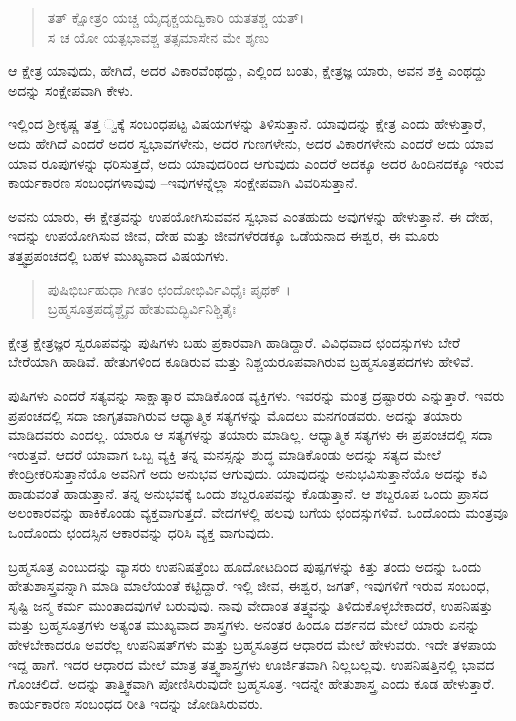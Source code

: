 \begin{verse}
ತತ್ ಕ್ಷೋತ್ರಂ ಯಚ್ಚ ಯೈದೃಕ್ಚಯದ್ವಿಕಾರಿ ಯತತಶ್ಚ ಯತ್​।\\ಸ ಚ ಯೋ ಯತ್ಪಭಾವಶ್ಚ ತತ್ಸಮಾಸೇನ ಮೇ ಶೃಣು 
\end{verse}

{\small ಆ ಕ್ಷೇತ್ರ ಯಾವುದು, ಹೇಗಿದೆ, ಅದರ ವಿಕಾರವೆಂಥದ್ದು, ಎಲ್ಲಿಂದ ಬಂತು, ಕ್ಷೇತ್ರಜ್ಞ ಯಾರು, ಅವನ ಶಕ್ತಿ ಎಂಥದ್ದು ಅದನ್ನು ಸಂಕ್ಷೇಪವಾಗಿ ಕೇಳು.}

ಇಲ್ಲಿಂದ ಶ್ರೀಕೃಷ್ಣ ತತ್ತ ್ವಕ್ಕೆ ಸಂಬಂಧಪಟ್ಟ ವಿಷಯಗಳನ್ನು ತಿಳಿಸುತ್ತಾನೆ. ಯಾವುದನ್ನು ಕ್ಷೇತ್ರ ಎಂದು ಹೇಳುತ್ತಾರೆ, ಅದು ಹೇಗಿದೆ ಎಂದರೆ ಅದರ ಸ್ವಭಾವಗಳೇನು, ಅದರ ಗುಣಗಳೇನು, ಅದರ ವಿಕಾರಗಳೇನು ಎಂದರೆ ಅದು ಯಾವ ಯಾವ ರೂಪುಗಳನ್ನು ಧರಿಸುತ್ತದೆ, ಅದು ಯಾವುದರಿಂದ ಆಗುವುದು ಎಂದರೆ ಅದಕ್ಕೂ ಅದರ ಹಿಂದಿನದಕ್ಕೂ ಇರುವ ಕಾರ್ಯಕಾರಣ ಸಂಬಂಧಗಳಾವುವು –ಇವುಗಳನ್ನೆಲ್ಲಾ ಸಂಕ್ಷೇಪವಾಗಿ ವಿವರಿಸುತ್ತಾನೆ.

ಅವನು ಯಾರು, ಈ ಕ್ಷೇತ್ರವನ್ನು ಉಪಯೋಗಿಸುವವನ ಸ್ವಭಾವ ಎಂತಹುದು ಅವುಗಳನ್ನು ಹೇಳುತ್ತಾನೆ. ಈ ದೇಹ, ಇದನ್ನು ಉಪಯೋಗಿಸುವ ಜೀವ, ದೇಹ ಮತ್ತು ಜೀವಗಳೆರಡಕ್ಕೂ ಒಡೆಯನಾದ ಈಶ್ವರ, ಈ ಮೂರು ತತ್ತ್ವಪ್ರಪಂಚದಲ್ಲಿ ಬಹಳ ಮುಖ್ಯವಾದ ವಿಷಯಗಳು.

\begin{verse}
ಪುಷಿಭಿರ್ಬಹುಧಾ ಗೀತಂ ಛಂದೋಭಿರ್ವಿವಿಧೈಃ ಪೃಥಕ್ ।\\ಬ್ರಹ್ಮಸೂತ್ರಪದೈಶ್ಚೈವ ಹೇತುಮದ್ಭಿರ್ವಿನಿಶ್ಚಿತೈಃ 
\end{verse}

{\small ಕ್ಷೇತ್ರ ಕ್ಷೇತ್ರಜ್ಞರ ಸ್ವರೂಪವನ್ನು ಪುಷಿಗಳು ಬಹು ಪ್ರಕಾರವಾಗಿ ಹಾಡಿದ್ದಾರೆ. ವಿವಿಧವಾದ ಛಂದಸ್ಸುಗಳು ಬೇರೆ ಬೇರೆಯಾಗಿ ಹಾಡಿವೆ. ಹೇತುಗಳಿಂದ ಕೂಡಿರುವ ಮತ್ತು ನಿಶ್ಚಯರೂಪವಾಗಿರುವ ಬ್ರಹ್ಮಸೂತ್ರಪದಗಳು ಹೇಳಿವೆ.}

ಪುಷಿಗಳು ಎಂದರೆ ಸತ್ಯವನ್ನು ಸಾಕ್ಷಾತ್ಕಾರ ಮಾಡಿಕೊಂಡ ವ್ಯಕ್ತಿಗಳು. ಇವರನ್ನು ಮಂತ್ರ ದ್ರಷ್ಟಾರರು ಎನ್ನುತ್ತಾರೆ. ಇವರು ಪ್ರಪಂಚದಲ್ಲಿ ಸದಾ ಜಾಗೃತವಾಗಿರುವ ಆಧ್ಯಾತ್ಮಿಕ ಸತ್ಯಗಳನ್ನು ಮೊದಲು ಮನಗಂಡವರು. ಅದನ್ನು ತಯಾರು ಮಾಡಿದವರು ಎಂದಲ್ಲ. ಯಾರೂ ಆ ಸತ್ಯಗಳನ್ನು ತಯಾರು ಮಾಡಿಲ್ಲ. ಆಧ್ಯಾತ್ಮಿಕ ಸತ್ಯಗಳು ಈ ಪ್ರಪಂಚದಲ್ಲಿ ಸದಾ ಇರುತ್ತವೆ. ಆದರೆ ಯಾವಾಗ ಒಬ್ಬ ವ್ಯಕ್ತಿ ತನ್ನ ಮನಸ್ಸನ್ನು ಶುದ್ಧ ಮಾಡಿಕೊಂಡು ಅದನ್ನು ಸತ್ಯದ ಮೇಲೆ ಕೇಂದ್ರೀಕರಿಸುತ್ತಾನೆಯೊ ಅವನಿಗೆ ಅದು ಅನುಭವ ಆಗುವುದು. ಯಾವುದನ್ನು ಅನುಭವಿಸುತ್ತಾನೆಯೊ ಅದನ್ನು ಕವಿ ಹಾಡುವಂತೆ ಹಾಡುತ್ತಾನೆ. ತನ್ನ ಅನುಭವಕ್ಕೆ ಒಂದು ಶಬ್ದರೂಪವನ್ನು ಕೊಡುತ್ತಾನೆ. ಆ ಶಬ್ದರೂಪ ಒಂದು ಪ್ರಾಸದ ಅಲಂಕಾರವನ್ನು ಹಾಕಿಕೊಂಡು ವ್ಯಕ್ತವಾಗುತ್ತದೆ. ವೇದಗಳಲ್ಲಿ ಹಲವು ಬಗೆಯ ಛಂದಸ್ಸುಗಳಿವೆ. ಒಂದೊಂದು ಮಂತ್ರವೂ ಒಂದೊಂದು ಛಂದಸ್ಸಿನ ಆಕಾರವನ್ನು ಧರಿಸಿ ವ್ಯಕ್ತ ವಾಗುವುದು.

ಬ್ರಹ್ಮಸೂತ್ರ ಎಂಬುದನ್ನು ವ್ಯಾಸರು ಉಪನಿಷತ್ತೆಂಬ ಹೂದೋಟದಿಂದ ಪುಷ್ಪಗಳನ್ನು ಕಿತ್ತು ತಂದು ಅದನ್ನು ಒಂದು ಹೇತುಶಾಸ್ತ್ರವನ್ನಾಗಿ ಮಾಡಿ ಮಾಲೆಯಂತೆ ಕಟ್ಟಿದ್ದಾರೆ. ಇಲ್ಲಿ ಜೀವ, ಈಶ್ವರ, ಜಗತ್, ಇವುಗಳಿಗೆ ಇರುವ ಸಂಬಂಧ, ಸೃಷ್ಟಿ ಜನ್ಮ ಕರ್ಮ ಮುಂತಾದವುಗಳೆ ಬರುವುವು. ನಾವು ವೇದಾಂತ ತತ್ತ್ವವನ್ನು ತಿಳಿದುಕೊಳ್ಳಬೇಕಾದರೆ, ಉಪನಿಷತ್ತು ಮತ್ತು ಬ್ರಹ್ಮಸೂತ್ರಗಳು ಅತ್ಯಂತ ಮುಖ್ಯವಾದ ಶಾಸ್ತ್ರಗಳು. ಅನಂತರ ಹಿಂದೂ ದರ್ಶನದ ಮೇಲೆ ಯಾರು ಏನನ್ನು ಹೇಳಬೇಕಾದರೂ ಅವರೆಲ್ಲ ಉಪನಿಷತ್​ಗಳು ಮತ್ತು ಬ್ರಹ್ಮಸೂತ್ರದ ಆಧಾರದ ಮೇಲೆ ಹೇಳುವರು. ಇದೇ ತಳಪಾಯ ಇದ್ದ ಹಾಗೆ. ಇದರ ಆಧಾರದ ಮೇಲೆ ಮಾತ್ರ ತತ್ತ್ವಶಾಸ್ತ್ರಗಳು ಊರ್ಜಿತವಾಗಿ ನಿಲ್ಲಬಲ್ಲವು. ಉಪನಿಷತ್ತಿನಲ್ಲಿ ಭಾವದ ಗೊಂಚಲಿದೆ. ಅದನ್ನು ತಾತ್ತ್ವಿಕವಾಗಿ ಪೋಣಿಸಿರುವುದೇ ಬ್ರಹ್ಮಸೂತ್ರ. ಇದನ್ನೇ ಹೇತುಶಾಸ್ತ್ರ ಎಂದು ಕೂಡ ಹೇಳುತ್ತಾರೆ. ಕಾರ್ಯಕಾರಣ ಸಂಬಂಧದ ರೀತಿ ಇದನ್ನು ಜೋಡಿಸಿರುವರು.

